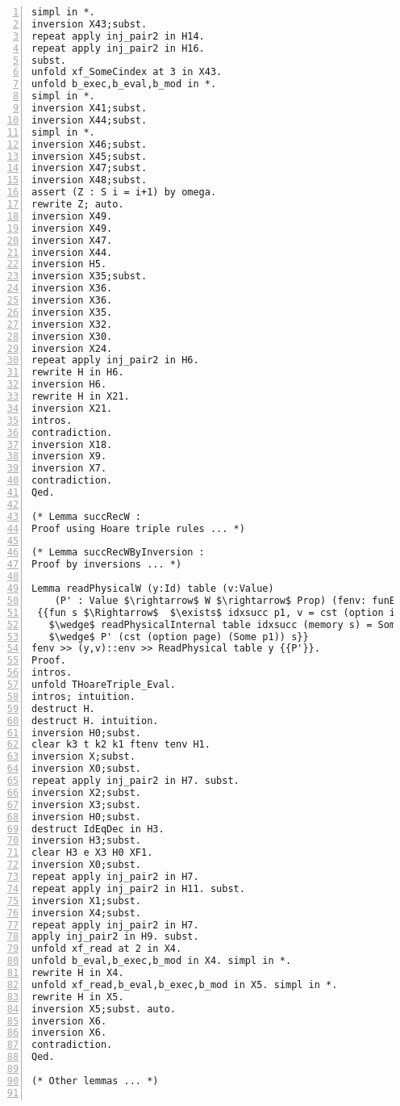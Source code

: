 \begin{appendices}
\begin{lstlisting}[xleftmargin=-.1\textwidth,
xrightmargin=-.1\textwidth,
mathescape=true,numbers=left]
simpl in *.
inversion X43;subst.
repeat apply inj_pair2 in H14.
repeat apply inj_pair2 in H16.
subst.
unfold xf_SomeCindex at 3 in X43.
unfold b_exec,b_eval,b_mod in *.
simpl in *.
inversion X41;subst.
inversion X44;subst.
simpl in *.
inversion X46;subst.
inversion X45;subst.
inversion X47;subst.
inversion X48;subst.
assert (Z : S i = i+1) by omega.
rewrite Z; auto.
inversion X49.
inversion X49.
inversion X47.
inversion X44.
inversion H5.
inversion X35;subst.
inversion X36.
inversion X36.
inversion X35.
inversion X32.
inversion X30.
inversion X24.
repeat apply inj_pair2 in H6.
rewrite H in H6.
inversion H6.
rewrite H in X21.
inversion X21.
intros.
contradiction.
inversion X18.
inversion X9.
inversion X7.
contradiction.
Qed.

(* Lemma succRecW : 
Proof using Hoare triple rules ... *)

(* Lemma succRecWByInversion : 
Proof by inversions ... *)

Lemma readPhysicalW (y:Id) table (v:Value) 
	(P' : Value $\rightarrow$ W $\rightarrow$ Prop) (fenv: funEnv) (env: valEnv) :
 {{fun s $\Rightarrow$  $\exists$ idxsucc p1, v = cst (option index) (Some idxsucc)
   $\wedge$ readPhysicalInternal table idxsucc (memory s) = Some p1 
   $\wedge$ P' (cst (option page) (Some p1)) s}} 
fenv >> (y,v)::env >> ReadPhysical table y {{P'}}.
Proof.
intros.
unfold THoareTriple_Eval.
intros; intuition.
destruct H.
destruct H. intuition.
inversion H0;subst.
clear k3 t k2 k1 ftenv tenv H1.
inversion X;subst.
inversion X0;subst.
repeat apply inj_pair2 in H7. subst.
inversion X2;subst.
inversion X3;subst.
inversion H0;subst.
destruct IdEqDec in H3.
inversion H3;subst.
clear H3 e X3 H0 XF1. 
inversion X0;subst.
repeat apply inj_pair2 in H7.
repeat apply inj_pair2 in H11. subst.
inversion X1;subst.
inversion X4;subst.
repeat apply inj_pair2 in H7.
apply inj_pair2 in H9. subst.
unfold xf_read at 2 in X4.
unfold b_eval,b_exec,b_mod in X4. simpl in *.
rewrite H in X4.
unfold xf_read,b_eval,b_exec,b_mod in X5. simpl in *.
rewrite H in X5.
inversion X5;subst. auto.
inversion X6.
inversion X6.
contradiction.
Qed.

(* Other lemmas ... *)


\end{lstlisting}
\end{appendices}
